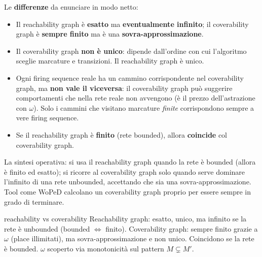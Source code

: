 Le \textbf{differenze} da enunciare in modo netto:
\begin{itemize}
  \item Il reachability graph è \textbf{esatto} ma \textbf{eventualmente infinito}; il coverability graph è \textbf{sempre finito} ma è una \textbf{sovra-approssimazione}.
  \item Il coverability graph \textbf{non è unico}: dipende dall'ordine con cui l'algoritmo sceglie marcature e transizioni. Il reachability graph è unico.
  \item Ogni firing sequence reale ha un cammino corrispondente nel coverability graph, ma \textbf{non vale il viceversa}: il coverability graph può suggerire comportamenti che nella rete reale non avvengono (è il prezzo dell'astrazione con $\omega$). Solo i cammini che visitano marcature \emph{finite} corrispondono sempre a vere firing sequence.
  \item Se il reachability graph è \textbf{finito} (rete bounded), allora \textbf{coincide} col coverability graph.
\end{itemize}

La sintesi operativa: si usa il reachability graph quando la rete è bounded (allora è finito ed esatto); si ricorre al coverability graph solo quando serve dominare l'infinito di una rete unbounded, accettando che sia una sovra-approssimazione. Tool come WoPeD calcolano un coverability graph proprio per essere sempre in grado di terminare.

\begin{puntochiave}{reachability vs coverability}
Reachability graph: esatto, unico, ma infinito se la rete è unbounded (bounded $\iff$ finito). Coverability graph: sempre finito grazie a $\omega$ (place illimitati), ma sovra-approssimazione e non unico. Coincidono se la rete è bounded. $\omega$ scoperto via monotonicità sul pattern $M\subsetneq M'$.
\end{puntochiave}
